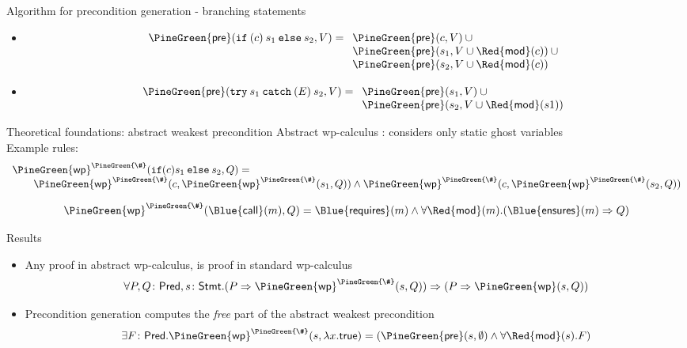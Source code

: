 \documentclass[final,nocolorBG,a4,marieke,nototal,pdf, accumulate,slideColor]{prosper}
\begin{document}
\begin{slide}{Algorithm for precondition generation - branching statements}
\begin{itemize}
   \item {}
\[
\mathsf{\PineGreen{pre}}(\mathtt{if\:(} c \mathtt{)\:} s_1 \mathtt{\:else\:} s_2,
V)  = 
\begin{array}[t]{l}
   \mathsf{\PineGreen{pre}}(c, V) \:\cup \\
   \mathsf{\PineGreen{pre}}(s_1, V \cup \mathsf{\Red{mod}}(c)) \:\cup\\
   \mathsf{\PineGreen{pre}}(s_2, V \cup \mathsf{\Red{mod}}(c))
\end{array}\]
\item {}
\[\mathsf{\PineGreen{pre}}(\mathtt{try\:} s_1 \mathtt{\:catch\:(} E \mathtt{)\:} s_2, V)  =  \begin{array}[t]{l}
   \mathsf{\PineGreen{pre}}(s_1, V) \:\cup \\
   \mathsf{\PineGreen{pre}}(s_2, V \cup \mathsf{\Red{mod}}(s1))
  \end{array}\]
\end{itemize}
\end{slide}



\begin{slide}{Theoretical foundations: abstract weakest precondition}
Abstract wp-calculus : considers only static 
ghost variables\\
Example rules:
\[
\begin{array}{l}
\mathsf{\PineGreen{wp}}^{\PineGreen{\#}}(\mathtt{if
(}c\mathtt{)}s_1\mathtt{\:else\:}s_2,Q) =\\
\qquad
\mathsf{\PineGreen{wp}}^{\PineGreen{\#}}(c, \mathsf{\PineGreen{wp}}^{\PineGreen{\#}}(s_1, Q)) \wedge
\mathsf{\PineGreen{wp}}^{\PineGreen{\#}}(c,
\mathsf{\PineGreen{wp}}^{\PineGreen{\#}}(s_2, Q))
\end{array}
\]

\[
\mathsf{\PineGreen{wp}}^{\PineGreen{\#}}(\mathsf{\Blue{call}}(m), Q) =
  \mathsf{\Blue{requires}}(m) \wedge 
  \forall \mathsf{\Red{mod}}(m). (\mathsf{\Blue{ensures}}(m) \Rightarrow Q)
\]
\end{slide}

\begin{slide}{Results}
\begin{itemize}
\item Any proof in abstract wp-calculus, is proof in standard
wp-calculus
\[
\forall P, Q\colon\mathsf{Pred}, s\colon\mathsf{Stmt}. 
(P \Rightarrow \mathsf{\PineGreen{wp}}^{\PineGreen{\#}}(s, Q)) \Rightarrow
               (P \Rightarrow \mathsf{\PineGreen{wp}}(s, Q))
\]
\item Precondition generation computes the \emph{free} part of the
abstract weakest precondition
\[
\exists F\colon\mathsf{Pred}.  
             \mathsf{\PineGreen{wp}}^{\PineGreen{\#}}(s, \lambda x. \mathsf{true}) = 
             (\mathsf{\PineGreen{pre}}(s, \emptyset) \wedge \forall
              \mathsf{\Red{mod}}(s). F) 
\]
\end{itemize}
\end{slide}
\end{document}
